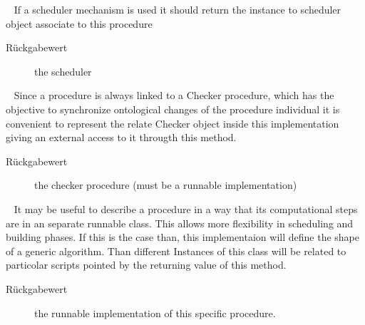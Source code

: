 \begin{description}
\begin{description}
\end{description}
\item[{\ltdHypertarget{ontologyFramework.OFProcedureManagment.OFProcedureInterface.getScheduler()}{getScheduler}\label{ontologyFramework.OFProcedureManagment.OFProcedureInterface.getScheduler()}}]
~ If a scheduler mechanism is used it should return the 
 instance to scheduler object associate to this procedure
\begin{description}
\item[Rückgabewert] 
the scheduler
\end{description}
\item[{\ltdHypertarget{ontologyFramework.OFProcedureManagment.OFProcedureInterface.getCheckerJob()}{getCheckerJob}\label{ontologyFramework.OFProcedureManagment.OFProcedureInterface.getCheckerJob()}}]
~ Since a procedure is always linked to a Checker procedure, which has the 
 objective to synchronize ontological changes of the procedure individual
 it is convenient to represent the relate Checker object inside this
 implementation giving an external access to it througth this method.
\begin{description}
\item[Rückgabewert] 
the checker procedure (must be a runnable implementation)
\end{description}
\item[{\ltdHypertarget{ontologyFramework.OFProcedureManagment.OFProcedureInterface.getMainJob()}{getMainJob}\label{ontologyFramework.OFProcedureManagment.OFProcedureInterface.getMainJob()}}]
~ It may be useful to describe a procedure in a way that its
 computational steps are in an separate runnable class. This
 allows more flexibility in scheduling and building phases.
 If this is the case than, this implementaion will define the 
 shape of a generic algorithm. Than different Instances of
 this class will be related to particolar scripts pointed by
 the returning value of this method.
\begin{description}
\item[Rückgabewert] 
the runnable implementation of this specific procedure.
\end{description}
\end{description}

